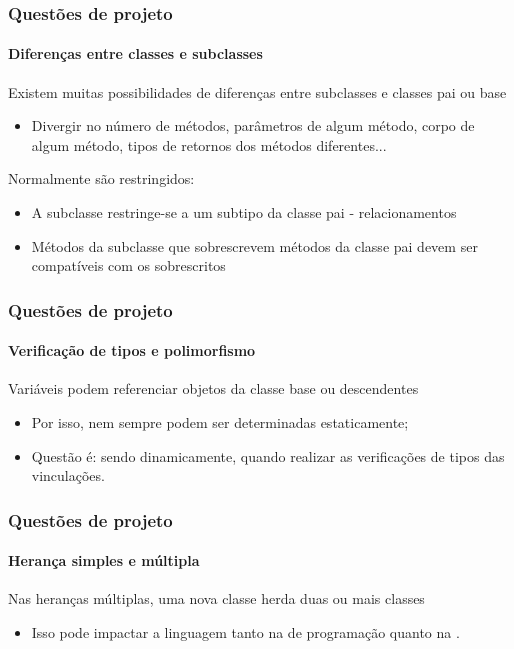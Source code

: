 \begin{frame}
\frametitle{Questões de projeto}
\framesubtitle{Diferenças entre classes e subclasses}

Existem muitas possibilidades de diferenças entre subclasses e classes pai ou base
\begin{itemize}
\item Divergir no número de métodos, parâmetros de algum método, corpo de algum método, tipos de retornos dos métodos diferentes...
\end{itemize}

Normalmente são restringidos:
\begin{itemize}
\item A subclasse restringe-se a um subtipo da classe pai - relacionamentos 
\item Métodos da subclasse que sobrescrevem métodos da classe pai devem ser compatíveis com os sobrescritos
\end{itemize}

\end{frame}

\begin{frame}
\frametitle{Questões de projeto}
\framesubtitle{Verificação de tipos e polimorfismo}

Variáveis  podem referenciar objetos da classe base ou descendentes

\begin{itemize}
	\item Por isso, nem sempre podem ser determinadas estaticamente;
	\item Questão é: sendo dinamicamente, quando realizar as verificações de tipos das vinculações.
\end{itemize}
\end{frame}

\begin{frame}
\frametitle{Questões de projeto}
\framesubtitle{Herança simples e múltipla}

Nas heranças múltiplas, uma nova classe herda duas ou mais classes
\begin{itemize}
	\item Isso pode impactar a linguagem tanto na  de programação quanto na .
\end{itemize}

\end{frame}

